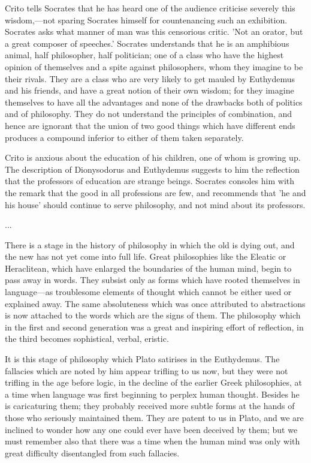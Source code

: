 \documentclass[11pt,letter]{article}
\begin{document}
\par  Crito tells Socrates that he has heard one of the audience criticise severely this wisdom,—not sparing Socrates himself for countenancing such an exhibition. Socrates asks what manner of man was this censorious critic. 'Not an orator, but a great composer of speeches.' Socrates understands that he is an amphibious animal, half philosopher, half politician; one of a class who have the highest opinion of themselves and a spite against philosophers, whom they imagine to be their rivals. They are a class who are very likely to get mauled by Euthydemus and his friends, and have a great notion of their own wisdom; for they imagine themselves to have all the advantages and none of the drawbacks both of politics and of philosophy. They do not understand the principles of combination, and hence are ignorant that the union of two good things which have different ends produces a compound inferior to either of them taken separately.

\par  Crito is anxious about the education of his children, one of whom is growing up. The description of Dionysodorus and Euthydemus suggests to him the reflection that the professors of education are strange beings. Socrates consoles him with the remark that the good in all professions are few, and recommends that 'he and his house' should continue to serve philosophy, and not mind about its professors.

\par  ...

\par  There is a stage in the history of philosophy in which the old is dying out, and the new has not yet come into full life. Great philosophies like the Eleatic or Heraclitean, which have enlarged the boundaries of the human mind, begin to pass away in words. They subsist only as forms which have rooted themselves in language—as troublesome elements of thought which cannot be either used or explained away. The same absoluteness which was once attributed to abstractions is now attached to the words which are the signs of them. The philosophy which in the first and second generation was a great and inspiring effort of reflection, in the third becomes sophistical, verbal, eristic.

\par  It is this stage of philosophy which Plato satirises in the Euthydemus. The fallacies which are noted by him appear trifling to us now, but they were not trifling in the age before logic, in the decline of the earlier Greek philosophies, at a time when language was first beginning to perplex human thought. Besides he is caricaturing them; they probably received more subtle forms at the hands of those who seriously maintained them. They are patent to us in Plato, and we are inclined to wonder how any one could ever have been deceived by them; but we must remember also that there was a time when the human mind was only with great difficulty disentangled from such fallacies.
\end{document}
